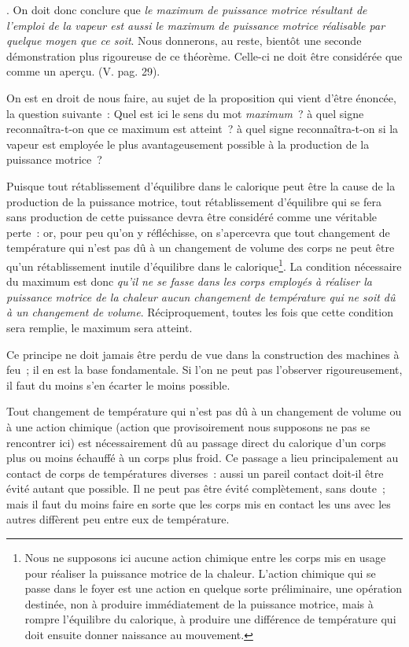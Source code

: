 \documentclass[french,twoside]{book} %
\begin{document}
{}. On doit donc conclure que \emph{le maximum de puissance motrice résultant de l’emploi de la vapeur est aussi le maximum de puissance motrice réalisable par quelque moyen que ce soit}. Nous donnerons, au reste, bientôt une seconde démonstration plus rigoureuse de ce théorème. Celle-ci ne doit être considérée que comme un aperçu. (V. pag. 29).\par
On est en droit de nous faire, au sujet de la proposition qui vient d’être énoncée, la question suivante : Quel est ici le sens du mot \emph{maximum} ? à quel signe reconnaîtra-t-on que ce maximum est atteint ? à quel signe reconnaîtra-t-on si la vapeur est employée le plus avantageusement possible à la production de la puissance motrice ?\par
Puisque tout rétablissement d’équilibre dans le calorique peut être la cause de la production de la puissance motrice, tout rétablissement d’équilibre qui se fera sans production de cette puissance devra être considéré comme une véritable perte : or, pour peu qu’on y réfléchisse, on s’apercevra que tout changement de température qui n’est pas dû à un changement de volume des corps ne peut être qu’un rétablissement inutile d’équilibre dans le calorique\footnote{Nous ne supposons ici aucune action chimique entre les corps mis en usage pour réaliser la puissance motrice de la chaleur. L’action chimique qui se passe dans le foyer est une action en quelque sorte préliminaire, une opération destinée, non à produire immédiatement de la puissance motrice, mais à rompre l’équilibre du calorique, à produire une différence de température qui doit ensuite donner naissance au mouvement.}. La condition nécessaire du maximum est donc \emph{qu’il ne se fasse dans les corps employés à réaliser la puissance motrice de la chaleur aucun changement de température qui ne soit dû à un changement de volume}. Réciproquement, toutes les fois que cette condition sera remplie, le maximum sera atteint.\par
Ce principe ne doit jamais être perdu de vue dans la construction des machines à feu ; il en est la base fondamentale. Si l’on ne peut pas l’observer rigoureusement, il faut du moins s’en écarter le moins possible.\par
Tout changement de température qui n’est pas dû à un changement de volume ou à une action chimique (action que provisoirement nous supposons ne pas se rencontrer ici) est nécessairement dû au passage direct du calorique d’un corps plus ou moins échauffé à un corps plus froid. Ce passage a lieu principalement au contact de corps de températures diverses : aussi un pareil contact doit-il être évité autant que possible. Il ne peut pas être évité complètement, sans doute ; mais il faut du moins faire en sorte que les corps mis en contact les uns avec les autres diffèrent peu entre eux de température.\par
\end{document}
